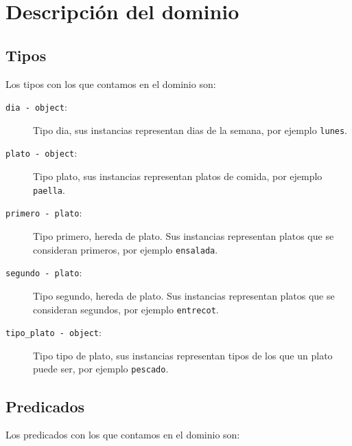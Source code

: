 \section{Descripción del dominio}

\subsection{Tipos}

Los tipos con los que contamos en el dominio son:

\begin{description}
  \item[\texttt{dia - object}:] Tipo dia, sus instancias representan 
    dias de la semana, por ejemplo \texttt{lunes}.
  \item[\texttt{plato - object}:] Tipo plato, sus instancias representan 
    platos de comida, por ejemplo \texttt{paella}.
  \item[\texttt{primero - plato}:] Tipo primero, hereda de plato. Sus 
    instancias representan platos que se consideran primeros, 
    por ejemplo \texttt{ensalada}.
  \item[\texttt{segundo - plato}:] Tipo segundo, hereda de plato. Sus 
    instancias representan platos que se consideran segundos, 
    por ejemplo \texttt{entrecot}.
  \item[\texttt{tipo\_plato - object}:] Tipo tipo de plato, sus instancias
    representan tipos de los que un plato puede ser,
    por ejemplo \texttt{pescado}.
\end{description}

\subsection{Predicados}

Los predicados con los que contamos en el dominio son:

